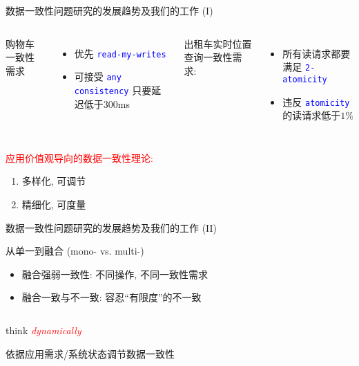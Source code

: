 \begin{frame}{数据一致性问题研究的发展趋势及我们的工作 (I)}
  \begin{columns}[t]
	  购物车一致性需求 %
	  \begin{itemize}
		\item 优先 \textcolor{blue}{\texttt{\small read-my-writes}}
		\item 可接受 \textcolor{blue}{\texttt{\small any consistency}} 只要延迟低于300ms
	  \end{itemize}
	  出租车实时位置查询一致性需求:
	  \begin{itemize}
		\item 所有读请求都要满足 \textcolor{blue}{\texttt{\small 2-atomicity}}
		\item 违反 \textcolor{blue}{\texttt{\small atomicity}} 的读请求低于$1\%$ 
	  \end{itemize}
  \end{columns}

  \pause
  \vspace{1.00cm}

  \textcolor{red}{应用价值观导向的数据一致性理论:}
  \begin{enumerate}
	\item 多样化, 可调节
	\item 精细化, 可度量
  \end{enumerate}
\end{frame}
\begin{frame}{数据一致性问题研究的发展趋势及我们的工作 (II)}
  \begin{description}
	\setlength{\itemsep}{10pt}
	\item[多样化:] 从单一到融合 (mono- vs. multi-)  
	  \vspace{5pt}
	  \begin{itemize}
		\setlength{\itemsep}{5pt}
		\item 融合强弱一致性: 不同操作, 不同一致性需求 
		\item 融合一致与不一致: 容忍``有限度''的不一致
	  \end{itemize}
	  \begin{columns}
	  \end{columns}
	\pause
	\item[可调节:] think \textcolor{red}{\it dynamically} 
	  \vspace{10pt}
	  \begin{center}
	    依据应用需求/系统状态调节数据一致性
	  \end{center}
  \end{description}
\end{frame}
